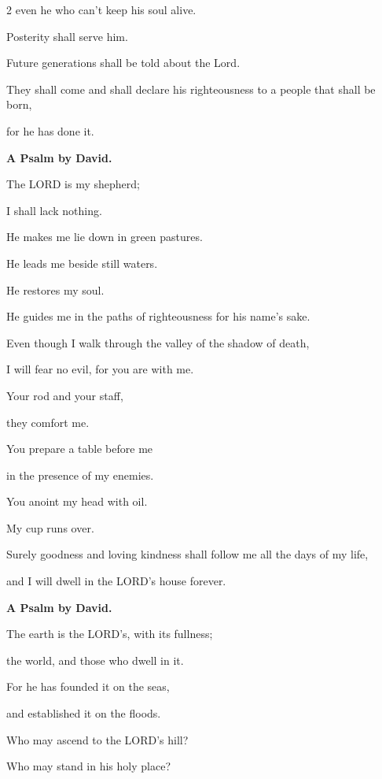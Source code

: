 \begin{multicols}{2}
	even he who can’t keep his soul alive.
	
	
	\myverse{}Posterity shall serve him.
	
	Future generations shall be told about the Lord.
	
	
	\myverse{}They shall come and shall declare his righteousness to a people
	that shall be born,
	
	for he has done it.
	
	
	\mychapter{}\textbf{A Psalm by David.}
	
	\quad \myverse*{}The LORD is my shepherd;
	
	I shall lack nothing.
	
	
	\myverse{}He makes me lie down in green pastures.
	
	He leads me beside still waters.
	
	
	\myverse{}He restores my soul.
	
	He guides me in the paths of righteousness for his name’s sake.
	
	
	\myverse{}Even though I walk through the valley of the shadow of death,
	
	I will fear no evil, for you are with me.
	
	Your rod and your staff,
	
	they comfort me.
	
	
	\myverse{}You prepare a table before me
	
	in the presence of my enemies.
	
	You anoint my head with oil.
	
	My cup runs over.
	
	
	\myverse{}Surely goodness and loving kindness shall follow me all the days
	of my life,
	
	and I will dwell in the LORD’s house forever.
	
	
	\mychapter{}\textbf{A Psalm by David.}
	
	\quad \myverse*{}The earth is the LORD’s, with its fullness;
	
	the world, and those who dwell in it.
	
	
	\myverse{}For he has founded it on the seas,
	
	and established it on the floods.
	
	\vspace{\baselineskip}
	
	\myverse{}Who may ascend to the LORD’s hill?
	
	Who may stand in his holy place?
	

\end{multicols}
